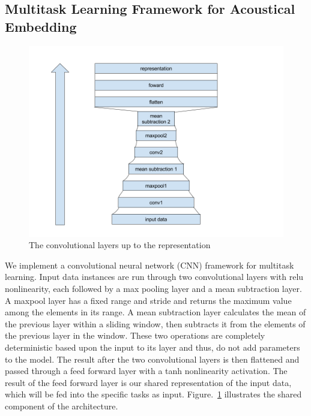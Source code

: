 \documentclass{article}
\begin{document}
\subsection{Multitask Learning Framework for Acoustical Embedding}
\begin{figure}[h!]
\centering
\includegraphics[scale=.2]{convnet_layers.png}
\caption{The convolutional layers up to the representation}
\label{fig:shared}
\end{figure}
We implement a convolutional neural network (CNN) framework for multitask learning.  Input data instances are run through two convolutional layers with relu nonlinearity, each followed by a max pooling layer and a mean subtraction layer. A maxpool layer has a fixed range and stride and returns the maximum value among the elements in its range. A mean subtraction layer calculates the mean of the previous layer within a sliding window, then subtracts it from the elements of the previous layer in the window.  These two operations are completely deterministic based upon the input to its layer and thus, do not add parameters to the model. The result after the two convolutional layers is then flattened and passed through a feed forward layer with a tanh nonlinearity activation.  The result of the feed forward layer is our shared representation of the input data, which will be fed into the specific tasks as input.  Figure.~\ref{fig:shared} illustrates the shared component of the architecture.
\end{document}
